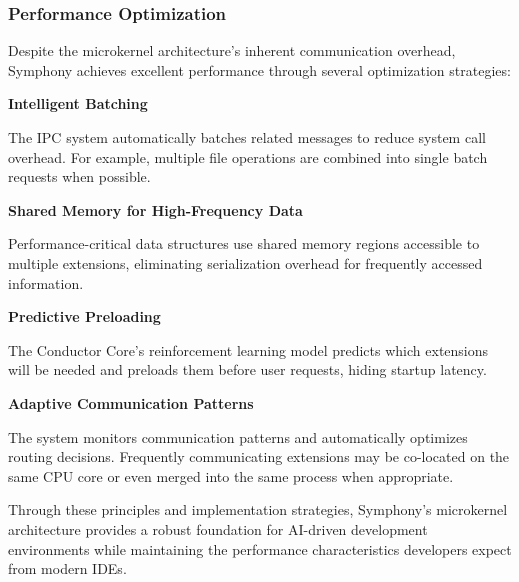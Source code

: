 \subsubsection{Performance Optimization}

Despite the microkernel architecture's inherent communication overhead, Symphony achieves excellent performance through several optimization strategies:

\textbf{Intelligent Batching}

The IPC system automatically batches related messages to reduce system call overhead. For example, multiple file operations are combined into single batch requests when possible.

\textbf{Shared Memory for High-Frequency Data}

Performance-critical data structures use shared memory regions accessible to multiple extensions, eliminating serialization overhead for frequently accessed information.

\textbf{Predictive Preloading}

The Conductor Core's reinforcement learning model predicts which extensions will be needed and preloads them before user requests, hiding startup latency.

\textbf{Adaptive Communication Patterns}

The system monitors communication patterns and automatically optimizes routing decisions. Frequently communicating extensions may be co-located on the same CPU core or even merged into the same process when appropriate.

Through these principles and implementation strategies, Symphony's microkernel architecture provides a robust foundation for AI-driven development environments while maintaining the performance characteristics developers expect from modern IDEs.